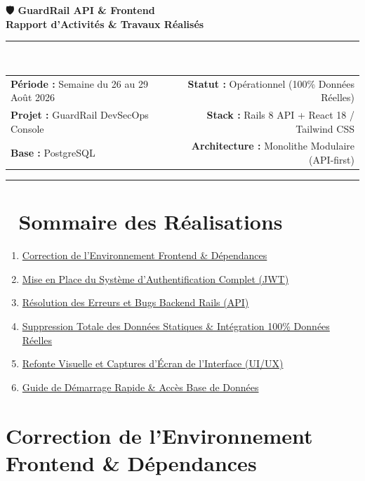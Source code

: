 \documentclass[11pt,a4paper]{article}
\begin{document}
\begin{center}
    {\Huge \bfseries \color{primary} 🛡️ GuardRail API \& Frontend}\\[3mm]
    {\Large \bfseries \color{secondary} Rapport d'Activités \& Travaux Réalisés}\\[4mm]
    \rule{\linewidth}{1pt}\\[2mm]
    \begin{tabularx}{\textwidth}{Xr}
        \textbf{Période :} Semaine du 26 au 29 Août 2026 & \textbf{Statut :} Opérationnel (100\% Données Réelles) \\
        \textbf{Projet :} GuardRail DevSecOps Console & \textbf{Stack :} Rails 8 API + React 18 / Tailwind CSS \\
        \textbf{Base :} PostgreSQL & \textbf{Architecture :} Monolithe Modulaire (API-first) \\
    \end{tabularx}
    \rule{\linewidth}{1pt}
\end{center}

\vspace{5mm}

\section*{📌 Sommaire des Réalisations}
\begin{enumerate}[label=\textbf{\arabic*.}]
    \item \hyperref[sec:frontend]{Correction de l'Environnement Frontend \& Dépendances}
    \item \hyperref[sec:auth]{Mise en Place du Système d'Authentification Complet (JWT)}
    \item \hyperref[sec:backend]{Résolution des Erreurs et Bugs Backend Rails (API)}
    \item \hyperref[sec:realdata]{Suppression Totale des Données Statiques \& Intégration 100\% Données Réelles}
    \item \hyperref[sec:ui]{Refonte Visuelle et Captures d'Écran de l'Interface (UI/UX)}
    \item \hyperref[sec:quickstart]{Guide de Démarrage Rapide \& Accès Base de Données}
\end{enumerate}

\vspace{5mm}

\section{Correction de l'Environnement Frontend \& Dépendances}
\label{sec:frontend}
\end{document}
